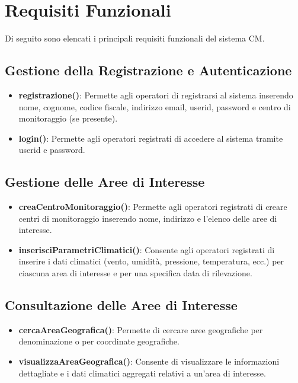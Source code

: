 \documentclass[a4paper,12pt]{article}
\begin{document}
\section{Requisiti Funzionali}
Di seguito sono elencati i principali requisiti funzionali del sistema CM.

\subsection{Gestione della Registrazione e Autenticazione}
\begin{itemize}
    \item \textbf{registrazione()}: Permette agli operatori di registrarsi al sistema inserendo nome, cognome, codice fiscale, indirizzo email, userid, password e centro di monitoraggio (se presente).
    \item \textbf{login()}: Permette agli operatori registrati di accedere al sistema tramite userid e password.
\end{itemize}

\subsection{Gestione delle Aree di Interesse}
\begin{itemize}
    \item \textbf{creaCentroMonitoraggio()}: Permette agli operatori registrati di creare centri di monitoraggio inserendo nome, indirizzo e l'elenco delle aree di interesse.
    \item \textbf{inserisciParametriClimatici()}: Consente agli operatori registrati di inserire i dati climatici (vento, umidità, pressione, temperatura, ecc.) per ciascuna area di interesse e per una specifica data di rilevazione.
\end{itemize}

\subsection{Consultazione delle Aree di Interesse}
\begin{itemize}
    \item \textbf{cercaAreaGeografica()}: Permette di cercare aree geografiche per denominazione o per coordinate geografiche.
    \item \textbf{visualizzaAreaGeografica()}: Consente di visualizzare le informazioni dettagliate e i dati climatici aggregati relativi a un'area di interesse.
\end{itemize}
\end{document}
